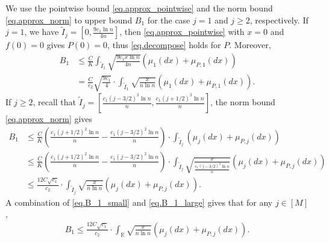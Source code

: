 \documentclass[final,12pt]{colt2018} %
\begin{document}
We use the pointwise bound \eqref{eq.approx_pointwise} and the norm bound \eqref{eq.approx_norm} to upper bound $B_1$ for the case $j=1$ and $j\ge 2$, respectively. If $j=1$, we have $\tilde{I}_j=[0,\frac{9c_1\ln n}{4n}]$, then \eqref{eq.approx_pointwise} with $x=0$ and $f(0)=0$ gives $P(0)=0$, thus \eqref{eq.decompose} holds for $P$. Moreover,
\begin{align}
B_1 &\le \frac{C}{K}\int_{\tilde{I}_1} \sqrt{\frac{9c_1x\ln n}{4n}} (\mu_1(dx)+\mu_{P,1}(dx)) \nonumber\\
&= \frac{C}{c_2}\sqrt{\frac{9c_1}{4}}\cdot \int_{\tilde{I}_1} \sqrt{\frac{x}{n\ln n}}(\mu_1(dx)+\mu_{P,1}(dx)). \label{eq.B_1_small}
\end{align}
If $j\ge 2$, recall that $\tilde{I}_j=[\frac{c_1(j-3/2)^2\ln n}{n},\frac{c_1(j+1/2)^2\ln n}{n}]$, the norm bound \eqref{eq.approx_norm} gives
\begin{align}
B_1 &\le \frac{C}{K}\left(\frac{c_1(j+1/2)^2\ln n}{n}-\frac{c_1(j-3/2)^2\ln n}{n}\right)\cdot \int_{\tilde{I}_j} (\mu_j(dx)+\mu_{P,j}(dx)) \nonumber\\
&\le \frac{C}{K}\left(\frac{c_1(j+1/2)^2\ln n}{n}-\frac{c_1(j-3/2)^2\ln n}{n}\right)\cdot \int_{\tilde{I}_j} \sqrt{\frac{x}{\frac{c_1(j-3/2)^2\ln n}{n}}}(\mu_j(dx)+\mu_{P,j}(dx)) \nonumber\\
&\le \frac{12C\sqrt{c_1}}{c_2} \cdot \int_{\tilde{I}_j} \sqrt{\frac{x}{n\ln n}}(\mu_j(dx)+\mu_{P,j}(dx)). \label{eq.B_1_large}
\end{align}
A combination of \eqref{eq.B_1_small} and \eqref{eq.B_1_large} gives that for any $j\in [M]$,
\begin{align}\label{eq.B_1_bound}
B_1 \le \frac{12C\sqrt{c_1}}{c_2} \cdot \int_{\mathbb{R}} \sqrt{\frac{x}{n\ln n}}(\mu_j(dx)+\mu_{P,j}(dx)).
\end{align}
\end{document}
